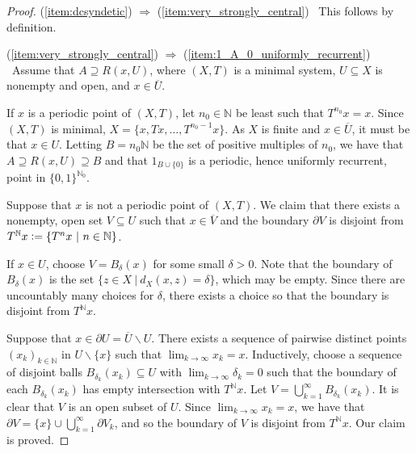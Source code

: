 \documentclass[letter,11pt]{article}
\theoremstyle{plain}
\theoremstyle{definition}
\theoremstyle{plain}
\theoremstyle{plain}
\numberwithin{equation}{section}
\newcommand{\N}{\mathbb{N}}
\newcommand{\defeq}{\vcentcolon=}
\renewcommand{\setminus}{\backslash}
\begin{document}
\begin{proof}
    (\ref{item:dcsyndetic}) $\Rightarrow$ (\ref{item:very_strongly_central}) \ This follows by definition.

    (\ref{item:very_strongly_central}) $\Rightarrow$ (\ref{item:1_A_0_uniformly_recurrent}) \ Assume that $A \supseteq R(x, U)$, where $(X, T)$ is a minimal system, $U \subseteq X$ is nonempty and open, and $x \in \overline{U}$.
    
    If $x$ is a periodic point of $(X, T)$, let $n_0 \in \N$ be least such that $T^{n_0} x = x$. Since $(X, T)$ is minimal, $X = \{x, Tx, \ldots, T^{n_0 - 1} x\}$. As $X$ is finite and $x \in \overline{U}$, it must be that $x \in U$. Letting $B = n_0 \N$ be the set of positive multiples of $n_0$, we have that $A \supseteq R(x, U) \supseteq B$ and that $1_{B \cup \{0\}}$ is a periodic, hence uniformly recurrent, point in $\{0, 1\}^{\N_0}$.

    Suppose that $x$ is not a periodic point of $(X,T)$. We claim that there exists a nonempty, open set $V \subseteq U$ such that $x \in \overline{V}$ and the boundary $\partial V$ is disjoint from $T^{\N} x \defeq \{T^n x \ | \ n \in \N\}$.

    If $x \in U$, choose $V = B_\delta(x)$ for some small $\delta > 0$. Note that the boundary of $B_\delta(x)$ is the set $\{z \in X \ | \ d_X(x, z) = \delta\}$, which may be empty. Since there are uncountably many choices for $\delta$, there exists a choice so that the boundary is disjoint from $T^{\N} x$. 


    Suppose that $x \in \partial U = \overline{U} \setminus U$.  There exists a sequence of pairwise distinct points $(x_k)_{k \in \N}$ in $U \setminus \{x\}$ such that $\lim_{k \to \infty }x_k = x$.
    Inductively, choose a sequence of disjoint balls $B_{\delta_k}(x_k) \subseteq U$ with $\lim_{k \to \infty} \delta_k = 0$ such that the boundary of each $B_{\delta_k}(x_k)$ has empty intersection with $T^{\N} x$.
    Let $V = \bigcup_{k = 1}^{\infty} B_{\delta_k}(x_k)$. It is clear that $V$ is an open subset of $U$. Since $\lim_{k \to \infty }x_k = x$, we have that $\partial V = \{x\} \cup \bigcup_{k=1}^{\infty} \partial V_k$, and so the boundary of $V$ is disjoint from $T^{\N} x$. Our claim is proved.
    

\end{proof}
\end{document}
